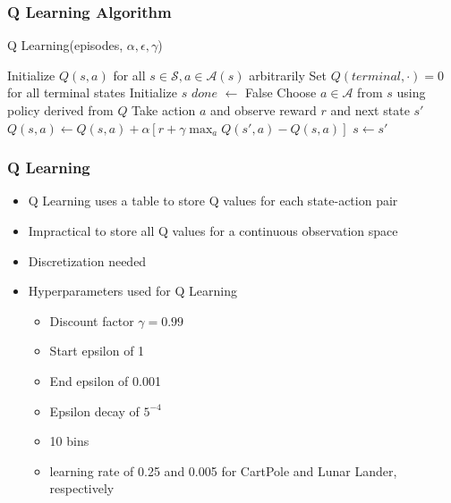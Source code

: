\documentclass{beamer}
\begin{document}
\begin{frame}
    \frametitle{Q Learning Algorithm}

    \begin{algorithm}[H]
        \caption{Q Learning(episodes, \(\alpha, \epsilon, \gamma\))}
        \label{alg:qlearning}
        \begin{algorithmic}[1]
            \State Initialize \(Q(s,a)\) for all \(s \in \mathcal{S}, a \in \mathcal{A}(s)\) arbitrarily
            \State Set \(Q(terminal, \cdot) = 0 \) for all terminal states
            \State Initialize \(s\)
            \State \(done\) \(\leftarrow\) False
            \State Choose \(a \in \mathcal{A}\) from \(s\) using policy derived from \(Q\)
            \State Take action \(a\) and observe reward \(r\) and next state \(s'\)
            \State \(Q(s, a) \leftarrow Q(s, a) + \alpha \left[r + \gamma \max_{a} Q(s', a) - Q(s, a)\right]\)
            \State \(s \leftarrow s'\)
            \EndWhile
            \EndFor
        \end{algorithmic}
    \end{algorithm}

\end{frame}

\begin{frame}
    \frametitle{Q Learning}

    \begin{itemize}
        \item Q Learning uses a table to store Q values for each state-action pair \pause
        \item Impractical to store all Q values for a continuous observation space \pause
        \item Discretization needed \pause
        \item Hyperparameters used for Q Learning\pause
              \begin{itemize}
                  \item Discount factor \(\gamma = 0.99\)
                  \item Start epsilon of 1
                  \item End epsilon of 0.001
                  \item Epsilon decay of \(5^{-4}\)
                  \item 10 bins
                  \item learning rate of 0.25 and 0.005 for CartPole and Lunar Lander, respectively
              \end{itemize}
    \end{itemize}

\end{frame}
\end{document}

